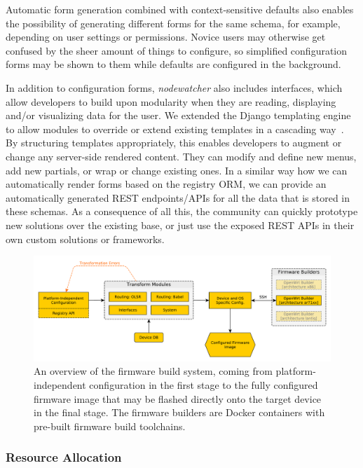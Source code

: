 \documentclass[5p,sort&compress]{elsarticle}
\newcommand{\nodewatcher}{\textit{nodewatcher}}
\begin{document}
Automatic form generation combined with context-sensitive defaults also enables the possibility of generating different forms for the same schema, for example, depending on user settings or permissions.
Novice users may otherwise get confused by the sheer amount of things to configure, so simplified configuration forms may be shown to them while defaults are configured in the background.

In addition to configuration forms, \nodewatcher{} also includes interfaces, which allow developers to build upon modularity when they are reading, displaying and/or visualizing data for the user.
We extended the Django templating engine to allow modules to override or extend existing templates in a cascading way~\cite{Overextend_2013}.
By structuring templates appropriately, this enables developers to augment or change any server-side rendered content.
They can modify and define new menus, add new partials, or wrap or change existing ones.
In a similar way how we can automatically render forms based on the registry ORM, we can provide an automatically generated REST endpoints/APIs for all the data that is stored in these schemas.
As a consequence of all this, the community can quickly prototype new solutions over the existing base, or just use the exposed REST APIs in their own custom solutions or frameworks.

\begin{figure}
  \centering
  \includegraphics[scale=0.5]{figures/firmware-buildsystem.pdf}
  \caption{An overview of the firmware build system, coming from platform-independent configuration in the first stage to the fully configured firmware image that may be flashed directly onto the target device in the final stage.
The firmware builders are Docker containers with pre-built firmware build toolchains.}
  \label{fig:firmware-build-system}
\end{figure}

\subsubsection{Resource Allocation}
\label{sec:resource-allocation}
\end{document}
